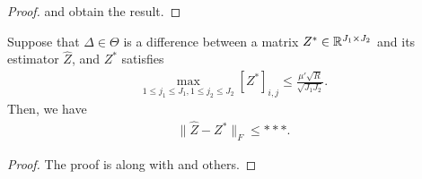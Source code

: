 {\begin{proof}
and obtain the result.
\end{proof}
\begin{lemma} \label{lem:rsc}
	Suppose that $\Delta \in \Theta$ is a difference between a matrix $Z^* \in \mathbb{R}^{J_1 \times J_2}$ and its estimator $\hat{Z}$, and $Z^*$ satisfies
	\begin{align*}
		\max_{1\leq j_1 \leq J_1, 1 \leq j_2 \leq J_2}[Z^*]_{i,j} \leq \frac{\mu' \sqrt{R}}{\sqrt{J_1 J_2}}.
	\end{align*}
	Then, we have
	\begin{align*}
		\|\hat{Z} - Z^*\|_F \leq ***.
	\end{align*}
\end{lemma}
\begin{proof}
The proof is along with \cite{candes2010matrix} and others.
\end{proof}
}


\fi

